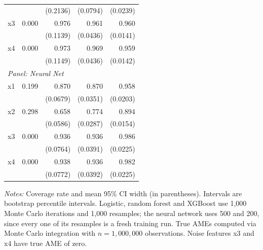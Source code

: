 \begin{table}[htbp]
\begin{threeparttable}
\begin{tabular}{lrrrr}
 &  & (0.2136) & (0.0794) & (0.0239) \\
\quad x3 & 0.000 & 0.976 & 0.961 & 0.960 \\
 &  & (0.1139) & (0.0436) & (0.0141) \\
\quad x4 & 0.000 & 0.973 & 0.969 & 0.959 \\
 &  & (0.1149) & (0.0436) & (0.0142) \\
\midrule
\multicolumn{5}{l}{\textit{Panel: Neural Net}} \\
\quad x1 & 0.199 & 0.870 & 0.870 & 0.958 \\
 &  & (0.0679) & (0.0351) & (0.0203) \\
\quad x2 & 0.298 & 0.658 & 0.774 & 0.894 \\
 &  & (0.0586) & (0.0287) & (0.0154) \\
\quad x3 & 0.000 & 0.936 & 0.936 & 0.986 \\
 &  & (0.0764) & (0.0391) & (0.0225) \\
\quad x4 & 0.000 & 0.938 & 0.936 & 0.982 \\
 &  & (0.0772) & (0.0392) & (0.0225) \\
\bottomrule
\end{tabular}
\begin{tablenotes}
\footnotesize
\item \textit{Notes:} Coverage rate and mean 95\% CI width (in parentheses). Intervals are bootstrap percentile intervals. Logistic, random forest and XGBoost use 1{,}000 Monte Carlo iterations and 1{,}000 resamples; the neural network uses 500 and 200, since every one of its resamples is a fresh training run. True AMEs computed via Monte Carlo integration with $n=1{,}000{,}000$ observations. Noise features x3 and x4 have true AME of zero.
\end{tablenotes}
\end{threeparttable}
\end{table}